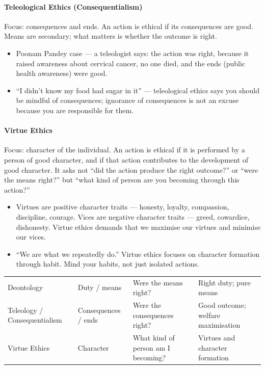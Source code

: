 \paragraph{Teleological Ethics (Consequentialism)} Focus: consequences and ends. An action is ethical if its consequences are good. Means are secondary; what matters is whether the outcome is right.

\begin{ExampleBox}
\begin{itemize}
\item Poonam Pandey case --- a teleologist says: the action was right, because it raised awareness about cervical cancer, no one died, and the ends (public health awareness) were good.
\item ``I didn't know my food had sugar in it'' --- teleological ethics says you should be mindful of consequences; ignorance of consequences is not an excuse because you are responsible for them.
\end{itemize}
\end{ExampleBox}

\paragraph{Virtue Ethics} Focus: character of the individual. An action is ethical if it is performed by a person of good character, and if that action contributes to the development of good character. It asks not ``did the action produce the right outcome?'' or ``were the means right?'' but ``what kind of person are you becoming through this action?''

\begin{KeyConcept}
\begin{itemize}
\item Virtues are positive character traits --- honesty, loyalty, compassion, discipline, courage. Vices are negative character traits --- greed, cowardice, dishonesty. Virtue ethics demands that we maximise our virtues and minimise our vices.
\item ``We are what we repeatedly do.'' Virtue ethics focuses on character formation through habit. Mind your habits, not just isolated actions.
\end{itemize}
\end{KeyConcept}

\begin{center}
\begin{tabularx}{\textwidth}{>{\raggedright\arraybackslash}p{2.6cm} >{\raggedright\arraybackslash}p{2.6cm} Y >{\raggedright\arraybackslash}p{2.9cm}}
 &  &  &  \\
\toprule
Deontology & Duty / means & Were the means right? & Right duty; pure means \\
Teleology / Consequentialism & Consequences / ends & Were the consequences right? & Good outcome; welfare maximisation \\
Virtue Ethics & Character & What kind of person am I becoming? & Virtues and character formation \\
\bottomrule
\end{tabularx}
\end{center}

